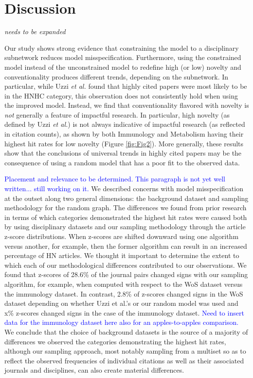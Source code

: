 \documentclass[NETN]{stjour}
\begin{document}
\section{Discussion}

\emph{needs to be expanded}

Our study shows strong evidence that constraining the model to a disciplinary subnetwork reduces model misspecification. Furthermore,  using the constrained model instead of the unconstrained model to redefine high (or low) novelty and conventionality produces different trends, depending on the subnetwork. In particular, while Uzzi {\em et al.} found that highly cited papers were most likely to be
in the HNHC category, this observation does not consistently hold when using the improved model. Instead, we find that conventionality flavored with novelty is {\em not} generally a feature of impactful research. 
In particular,  high novelty (as defined by Uzzi {\em et al.}) is not always indicative of impactful research (as reflected in citation counts), as shown by both Immunology and Metabolism having their highest hit rates for low novelty (Figure \ref{fig:Fig2}). More generally, these results show that the conclusions of universal trends in highly cited papers may be the consequence of using a random model that has a poor fit to the observed data.

\textcolor{blue}{Placement and relevance to be determined.  This paragraph is not yet well written... still working on it.} We described concerns with model misspecification at the outset along two general dimensions: the background dataset and sampling methodology for the random graph. The differences we found from prior research in terms of which categories demonstrated the highest hit rates were caused both by using disciplinary datasets and our sampling methodology through the article z-score distributions. When z-scores are shifted downward using one algorithm versus another, for example, then the former algorithm can result in an increased percentage of HN articles. We thought it important to determine the extent to which each of our methodological differences contributed to our observations.  We found that z-scores of 28.6\% of the journal pairs changed signs with our sampling algorithm, for example, when computed with respect to the WoS dataset versus the immunology dataset.  In contrast, 2.8\% of z-scores changed signs in the WoS dataset depending on whether Uzzi et al.'s or our random model was used and x\% z-scores changed signs in the case of the immunology dataset. \textcolor{blue}{Need to insert data for the immunology dataset here also for an apples-to-apples comparison.} We conclude that the choice of background datasets is the source of a majority of differences we observed the categories demonstrating the highest hit rates, although our sampling approach, most notably sampling from a multiset so as to reflect the observed frequencies of individual citations as well as their associated journals and disciplines, can also create material differences.     
\end{document}
